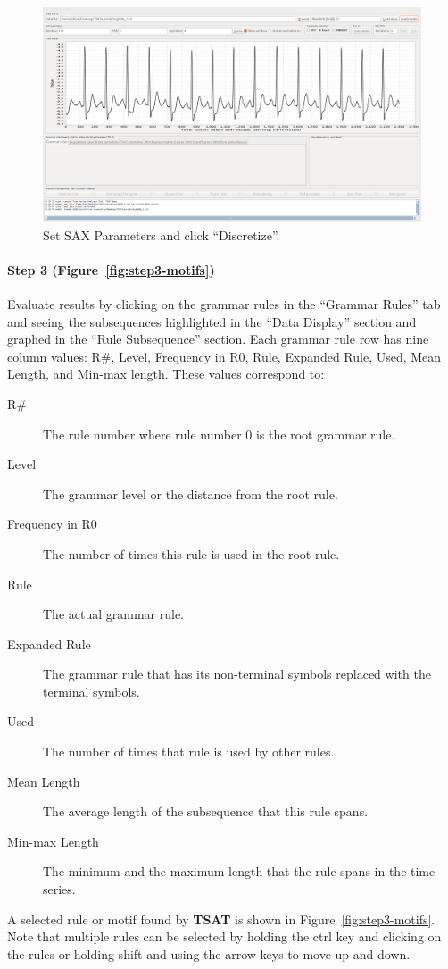 \documentclass[titlepage, letterpaper, 12pt]{article}
\newcommand\TSAT{\textbf{TSAT}}
\begin{document}
\begin{figure}[H]
	\centering
	\includegraphics[width=0.7\linewidth]{pictures/motifguide/Step2-loaded}
	\caption{Set SAX Parameters and click ``Discretize''.}
	\label{fig:step2-loaded}
\end{figure}


\paragraph{Step 3 (Figure~\ref{fig:step3-motifs})} Evaluate results by clicking on the grammar rules in the ``Grammar Rules'' tab and seeing the subsequences highlighted in the ``Data Display'' section and graphed in the ``Rule Subsequence'' section.  Each grammar rule row has nine column values: R\#, Level, Frequency in R0, Rule, Expanded Rule, Used, Mean Length, and Min-max length.  These values correspond to:

\begin{description}
	\item[R\#] The rule number where rule number 0 is the root grammar rule.
	\item[Level]  The grammar level or the distance from the root rule.
	\item[Frequency in R0]  The number of times this rule is used in the root rule.
	\item[Rule] The actual grammar rule.
	\item[Expanded Rule]  The grammar rule that has its non-terminal symbols replaced with the terminal symbols.
	\item[Used]  The number of times that rule is used by other rules.
	\item[Mean Length] The average length of the subsequence that this rule spans.
	\item[Min-max Length] The minimum and the maximum length that the rule spans in the time series.
\end{description}

A selected rule or motif found by {\TSAT} is shown in Figure~\ref{fig:step3-motifs}.  Note that multiple rules can be selected by holding the ctrl key and clicking on the rules or holding shift and using the arrow keys to move up and down.
\end{document}
